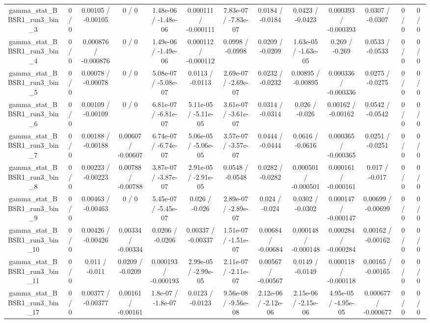\documentclass[10pt]{article}
\begin{document}
\begin{table}[htbp]
\begin{center}
\begin{tabular}{|c|c|c|c|c|c|c|c|c|c|c|c|c|}
  gamma_stat_BBSR1_run3_bin_3 & 0 / 0 & 0.00105 / -0.00105 & 0 / 0 & 1.48e-06 / -1.48e-06 & 0.000111 / -0.000111 & 7.83e-07 / -7.83e-07 & 0.0184 / -0.0184 & 0.0423 / -0.0423 & 0.000393 / -0.000393 & 0.0307 / -0.0307 & 0 / 0 & 0 / 0 \\ 
  gamma_stat_BBSR1_run3_bin_4 & 0 / 0 & 0.000876 / -0.000876 & 0 / 0 & 1.49e-06 / -1.49e-06 & 0.000112 / -0.000112 & 0.0998 / -0.0998 & 0.0209 / -0.0209 & 1.63e-05 / -1.63e-05 & 0.269 / -0.269 & 0.0533 / -0.0533 & 0 / 0 & 0 / 0 \\ 
  gamma_stat_BBSR1_run3_bin_5 & 0 / 0 & 0.00078 / -0.00078 & 0 / 0 & 5.08e-07 / -5.08e-07 & 0.0113 / -0.0113 & 2.69e-07 / -2.69e-07 & 0.0232 / -0.0232 & 0.00895 / -0.00895 & 0.000336 / -0.000336 & 0.0275 / -0.0275 & 0 / 0 & 0 / 0 \\ 
  gamma_stat_BBSR1_run3_bin_6 & 0 / 0 & 0.00109 / -0.00109 & 0 / 0 & 6.81e-07 / -6.81e-07 & 5.11e-05 / -5.11e-05 & 3.61e-07 / -3.61e-07 & 0.0314 / -0.0314 & 0.026 / -0.026 & 0.00162 / -0.00162 & 0.0542 / -0.0542 & 0 / 0 & 0 / 0 \\ 
  gamma_stat_BBSR1_run3_bin_7 & 0 / 0 & 0.00188 / -0.00188 & 0.00607 / -0.00607 & 6.74e-07 / -6.74e-07 & 5.06e-05 / -5.06e-05 & 3.57e-07 / -3.57e-07 & 0.0444 / -0.0444 & 0.0616 / -0.0616 & 0.000365 / -0.000365 & 0.0251 / -0.0251 & 0 / 0 & 0 / 0 \\ 
  gamma_stat_BBSR1_run3_bin_8 & 0 / 0 & 0.00223 / -0.00223 & 0.00788 / -0.00788 & 3.87e-07 / -3.87e-07 & 2.91e-05 / -2.91e-05 & 0.0548 / -0.0548 & 0.0282 / -0.0282 & 0.000501 / -0.000501 & 0.000161 / -0.000161 & 0.017 / -0.017 & 0 / 0 & 0 / 0 \\ 
  gamma_stat_BBSR1_run3_bin_9 & 0 / 0 & 0.00463 / -0.00463 & 0 / 0 & 5.45e-07 / -5.45e-07 & 0.026 / -0.026 & 2.89e-07 / -2.89e-07 & 0.024 / -0.024 & 0.0302 / -0.0302 & 0.000147 / -0.000147 & 0.00699 / -0.00699 & 0 / 0 & 0 / 0 \\ 
  gamma_stat_BBSR1_run3_bin_10 & 0 / 0 & 0.00426 / -0.00426 & 0.00334 / -0.00334 & 0.0206 / -0.0206 & 0.00337 / -0.00337 & 1.51e-07 / -1.51e-07 & 0.00684 / -0.00684 & 0.000148 / -0.000148 & 0.000284 / -0.000284 & 0.00162 / -0.00162 & 0 / 0 & 0 / 0 \\ 
  gamma_stat_BBSR1_run3_bin_11 & 0 / 0 & 0.011 / -0.011 & 0.0209 / -0.0209 & 0.000193 / -0.000193 & 2.99e-05 / -2.99e-05 & 2.11e-07 / -2.11e-07 & 0.00567 / -0.00567 & 0.0149 / -0.0149 & 0.000118 / -0.000118 & 0.00165 / -0.00165 & 0 / 0 & 0 / 0 \\ 
  gamma_stat_BBSR1_run3_bin_17 & 0 / 0 & 0.00377 / -0.00377 & 0.00161 / -0.00161 & 1.8e-07 / -1.8e-07 & 0.0123 / -0.0123 & 9.56e-08 / -9.56e-08 & 2.12e-06 / -2.12e-06 & 2.15e-06 / -2.15e-06 & 4.95e-05 / -4.95e-05 & 0.000677 / -0.000677 & 0 / 0 & 0 / 0 \\ 

\end{tabular}
\end{center}
\end{table}
\end{document}
